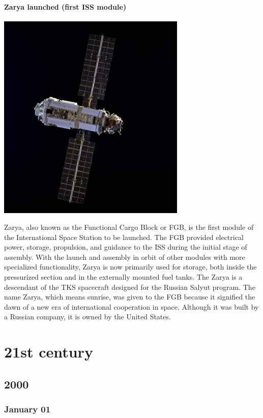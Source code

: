 \documentclass[11pt]{report}
\begin{document}
\subsection{Zarya launched (first ISS module)}
\vspace{2mm}\begin{center}\includegraphics[width=9cm]{./img/zarya.jpg}\end{center}
Zarya, also known as the Functional Cargo Block or FGB, is the first module of the International Space Station to be launched. The FGB provided electrical power, storage, propulsion, and guidance to the ISS during the initial stage of assembly. With the launch and assembly in orbit of other modules with more specialized functionality, Zarya is now primarily used for storage, both inside the pressurized section and in the externally mounted fuel tanks. The Zarya is a descendant of the TKS spacecraft designed for the Russian Salyut program. The name Zarya, which means sunrise, was given to the FGB because it signified the dawn of a new era of international cooperation in space. Although it was built by a Russian company, it is owned by the United States.




\part{21st century}
\chapter{2000}
\section{January 01}
\end{document}
